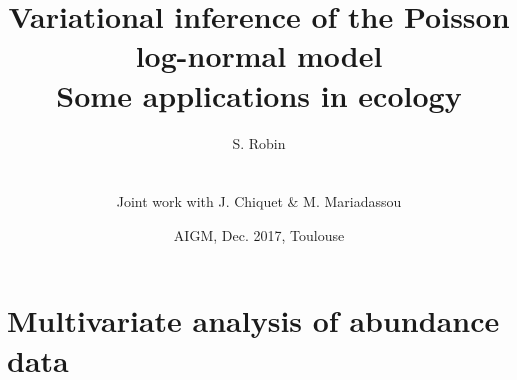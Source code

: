 \documentclass[10pt]{beamer}
\newcommand{\fignet}{/home/robin/Bureau/RECHERCHE/RESEAUX/EXPOSES/FIGURES}
\begin{document}

\title[Variational inference of the PLN model]{Variational inference of the Poisson log-normal model \\
  Some applications in ecology}

\author[S. Robin]{S. Robin \\ ~\\
  \begin{tabular}{ll}
    Joint work with J. Chiquet \& M. Mariadassou
  \end{tabular}
  }


\date[AIGM, Toulouse]{AIGM, Dec. 2017, Toulouse}

\maketitle

\section{Multivariate analysis of abundance data}
\frame{\tableofcontents[currentsection]}
\end{document}
